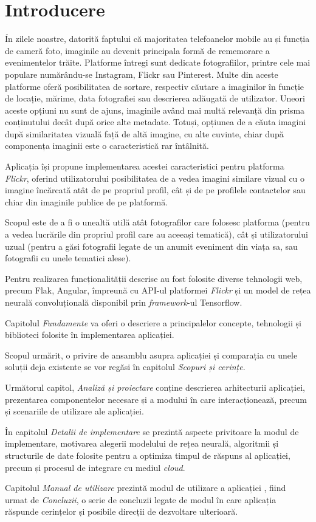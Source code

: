 \chapter*{Introducere} 

Ín zilele noastre, datorită faptului că  majoritatea telefoanelor mobile au și funcția de cameră foto, imaginile au devenit principala formă de rememorare a evenimentelor trăite. Platforme întregi sunt dedicate fotografiilor, printre cele mai populare numărându-se Instagram, Flickr sau Pinterest. Multe din aceste platforme oferă posibilitatea de sortare, respectiv căutare a imaginilor în funcție de locație, mărime, data fotografiei sau descrierea adăugată de utilizator. Uneori aceste opțiuni nu sunt de ajuns, imaginile având mai multă relevanță din prisma conținutului decât după orice alte metadate. Totuși, opțiunea de a căuta imagini după similaritatea vizuală față de altă imagine, cu alte cuvinte, chiar după componența imaginii este o caracteristică rar întâlnită.

Aplicația {\applicationtitle} își propune implementarea acestei caracteristici \linebreak pentru platforma \textit{Flickr}, oferind utilizatorului posibilitatea de a vedea imagini similare vizual cu o imagine încărcată atât de pe propriul profil, cât și de pe profilele contactelor sau chiar din imaginile publice de pe platformă.

Scopul {\applicationtitle} este de a fi o unealtă utilă atât fotografilor care folosesc platforma (pentru a vedea lucrările din propriul profil care au aceeași tematică), cât și utilizatorului uzual (pentru a găsi fotografii legate de un anumit eveniment din viața sa, sau fotografii cu unele tematici alese).

Pentru realizarea funcționalității descrise au fost folosite diverse tehnologii web, precum Flak, Angular, împreună cu API-ul platformei \textit{Flickr} și un model de rețea neurală convoluțională disponibil prin \textit{framework}-ul Tensorflow.

Capitolul \textit{Fundamente} va oferi o descriere a principalelor concepte, tehnologii și biblioteci folosite în implementarea aplicației. 

Scopul urmărit, o privire de ansamblu asupra aplicației și comparația cu unele soluții deja existente se vor regăsi în capitolul \textit{Scopuri și cerințe}.

Următorul capitol, \textit{Analiză și proiectare} conține descrierea arhitecturii aplicației, prezentarea componentelor necesare și a modului în care interacționează, precum și scenariile de utilizare ale aplicației.

În capitolul \textit{Detalii de implementare} se prezintă aspecte privitoare la modul de implementare, motivarea alegerii modelului de rețea neurală,  algoritmii și structurile de date folosite pentru a optimiza timpul de răspuns al aplicației, precum și procesul de integrare cu mediul \textit{cloud}.

Capitolul \textit{Manual de utilizare} prezintă modul de utilizare a aplicației
, fiind urmat de \textit{Concluzii}, o serie de concluzii legate de modul în care aplicația răspunde cerințelor și posibile direcții de dezvoltare ulterioară.
